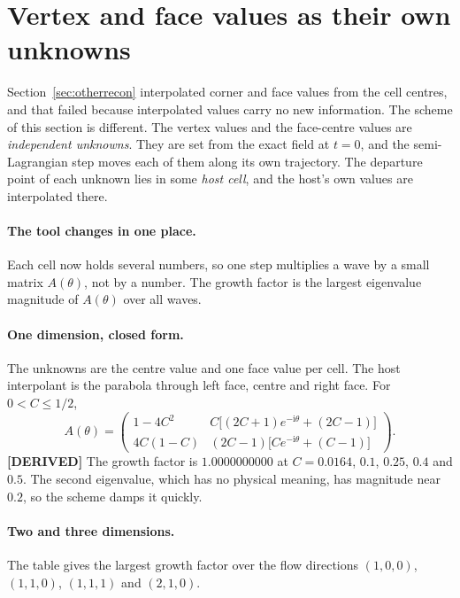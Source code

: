 \documentclass[11pt,a4paper]{article}
\newcommand{\derived}{\textcolor{blue!50!black}{\textbf{[DERIVED]}}}
\begin{document}
\section{Vertex and face values as their own unknowns}
\label{sec:multipoint}

Section~\ref{sec:otherrecon} interpolated corner and face values from the cell centres, and that
failed because interpolated values carry no new information. The scheme of this section is
different. The vertex values and the face-centre values are \emph{independent unknowns}. They
are set from the exact field at \(t = 0\), and the semi-Lagrangian step moves each of them along
its own trajectory. The departure point of each unknown lies in some \emph{host cell}, and the
host's own values are interpolated there.

\paragraph{The tool changes in one place.} Each cell now holds several numbers, so one step
multiplies a wave by a small matrix \(A(\theta)\), not by a number. The growth factor is the
largest eigenvalue magnitude of \(A(\theta)\) over all waves.

\paragraph{One dimension, closed form.} The unknowns are the centre value and one face value per
cell. The host interpolant is the parabola through left face, centre and right face. For
\(0 < C \le 1/2\),
\begin{equation}
  A(\theta) = \begin{pmatrix}
     1 - 4C^2 & C\bigl[(2C+1)e^{-\mathrm{i}\theta} + (2C-1)\bigr] \\[3pt]
     4C(1-C) & (2C-1)\bigl[C e^{-\mathrm{i}\theta} + (C-1)\bigr]
  \end{pmatrix}.
\end{equation}
\derived{} The growth factor is \(1.0000000000\) at \(C = 0.0164\), \(0.1\), \(0.25\), \(0.4\)
and \(0.5\). The second eigenvalue, which has no physical meaning, has magnitude near \(0.2\), so
the scheme damps it quickly.

\paragraph{Two and three dimensions.} The table gives the largest growth factor over the flow
directions \((1,0,0)\), \((1,1,0)\), \((1,1,1)\) and \((2,1,0)\).
\end{document}
